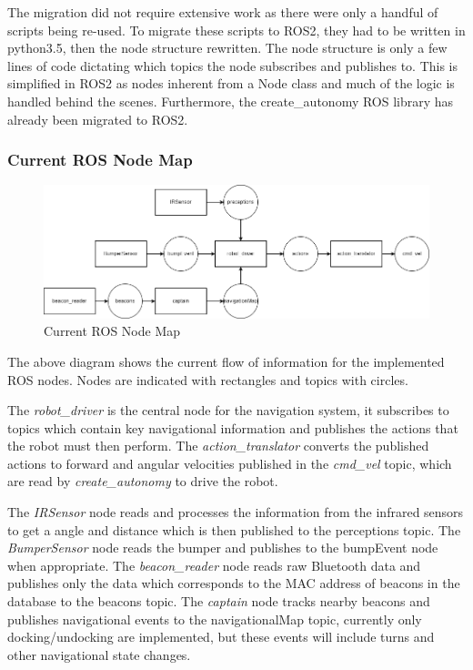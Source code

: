 \documentclass[12pt]{report}
\begin{document}
The migration did not require extensive work as there were only a handful of scripts being re-used. To migrate these scripts to ROS2, they had to be written in python3.5, then the node structure rewritten. The node structure is only a few lines of code dictating which topics the node subscribes and publishes to. This is simplified in ROS2 as nodes inherent from a Node class and much of the logic is handled behind the scenes. Furthermore, the create\_autonomy ROS library has already been migrated to ROS2.

\subsubsection{Current ROS Node Map}
\begin{figure}[H]
    \centering
    \includegraphics[scale=0.5]{images/ROS Node Diagram.png}
    \caption{Current ROS Node Map}
    \label{Current ROS Node Map}
\end{figure}

The above diagram shows the current flow of information for the implemented ROS nodes. Nodes are indicated with rectangles and topics with circles.

The \textit{robot\_driver} is the central node for the navigation system, it subscribes to topics which contain key navigational information and publishes the actions that the robot must then perform. The \textit{action\_translator} converts the published actions to forward and angular velocities published in the \textit{cmd\_vel} topic, which are read by \textit{create\_autonomy} to drive the robot.

The \textit{IRSensor} node reads and processes the information from the infrared  sensors to get a angle and distance which is then published to the perceptions topic. The \textit{BumperSensor} node reads the bumper and publishes to the bumpEvent node when appropriate. The \textit{beacon\_reader} node reads raw Bluetooth data and publishes only the data which corresponds to the MAC address of beacons in the database to the beacons topic. The \textit{captain} node tracks nearby beacons and publishes navigational events to the navigationalMap topic, currently only docking/undocking are implemented, but these events will include turns and other navigational state changes.
\end{document}
